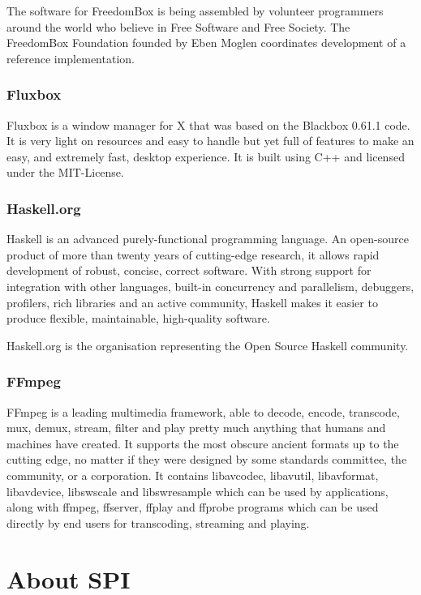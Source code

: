 \documentclass[letterpaper]{report}
\begin{document}
The software for FreedomBox is being assembled by volunteer programmers around
the world who believe in Free Software and Free Society. The FreedomBox
Foundation founded by Eben Moglen coordinates development of a reference
implementation.


\subsection{Fluxbox}

Fluxbox is a window manager for X that was based on the Blackbox 0.61.1 code. It
is very light on resources and easy to handle but yet full of features to make
an easy, and extremely fast, desktop experience. It is built using C++ and
licensed under the MIT-License.


\subsection{Haskell.org}

Haskell is an advanced purely-functional programming language. An open-source
product of more than twenty years of cutting-edge research, it allows rapid
development of robust, concise, correct software. With strong support for
integration with other languages, built-in concurrency and parallelism,
debuggers, profilers, rich libraries and an active community, Haskell makes it
easier to produce flexible, maintainable, high-quality software.

Haskell.org is the organisation representing the Open Source Haskell community.


\subsection{FFmpeg}

FFmpeg is a leading multimedia framework, able to decode, encode, transcode,
mux, demux, stream, filter and play pretty much anything that humans and
machines have created. It supports the most obscure ancient formats up to the
cutting edge, no matter if they were designed by some standards committee, the
community, or a corporation. It contains libavcodec, libavutil, libavformat,
libavdevice, libswscale and libswresample which can be used by applications,
along with ffmpeg, ffserver, ffplay and ffprobe programs which can be used
directly by end users for transcoding, streaming and playing.


\appendix
\chapter{About SPI}
\end{document}
